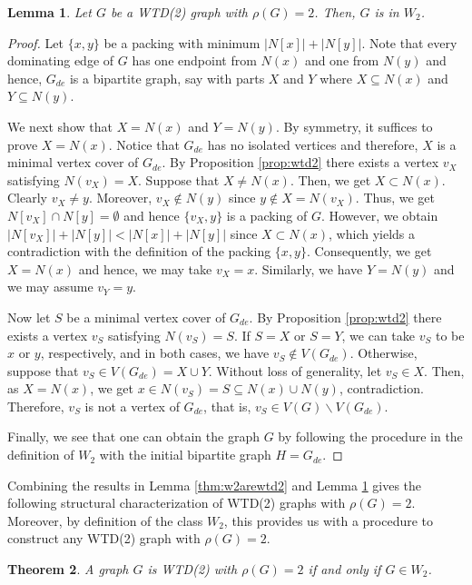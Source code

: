 \documentclass[11pt]{article}
\newtheorem{theorem}{Theorem}[section]
\newtheorem{lemma}[theorem]{Lemma}
\theoremstyle{definition}
\begin{document}
\begin{lemma}\label{lem:wtdimpw2}
Let $G$ be a WTD(2) graph with $\rho (G)=2$. Then, $G$ is in $W_2$.
\end{lemma}
\begin{proof}
Let $\{x,y\}$ be a packing with minimum $|N[x]|+ |N[y]|$.
Note that every dominating edge of $G$ has one endpoint from $N(x)$ and one from $N(y)$ and hence,
$G_{de}$ is a bipartite graph, say with parts $X$ and $Y$ where $X\subseteq N(x)$ and $Y\subseteq N(y)$.
	
We next show that $X=N(x)$ and $Y=N(y)$.
By symmetry, it suffices to prove $X=N(x)$.
Notice that $G_{de}$ has no isolated vertices and therefore,
$X$ is a minimal vertex cover of $G_{de}$.
By Proposition \ref{prop:wtd2} there exists a vertex $v_X$ satisfying $N(v_X)=X$.
Suppose that $X\neq N(x)$.
Then, we get $X \subset N(x)$.
Clearly $v_X \neq y$.
Moreover, $v_X \notin N(y)$ since $y\notin X=N(v_X)$.
Thus, we get $N[v_X] \cap N[y] = \emptyset$ and hence $\{v_X,y\}$ is a packing of $G$.
However, we obtain $|N[v_X]|+| N[y]|< |N[x]|+ |N[y]|$ since $X \subset N(x)$, which yields a contradiction with the definition of the packing $\{x,y\}$.
Consequently, we get $X=N(x)$ and hence, we may take $v_X=x$.
Similarly, we have $Y=N(y)$ and we may assume $v_Y=y$.
	
Now let $S$ be a minimal vertex cover of $G_{de}$.
By Proposition \ref{prop:wtd2} there exists a vertex $v_S$ satisfying $N(v_S)=S$.	If $S=X$ or $S=Y$, we can take $v_S$ to be $x$ or $y$, respectively, and in both cases, we have $v_S\notin V(G_{de})$.
Otherwise, suppose that $v_S \in V(G_{de})=X\cup Y$.
Without loss of generality, let $v_S \in X$.
Then, as $X=N(x)$, we get $x\in N(v_S)=S \subseteq N(x) \cup N(y)$, contradiction.
Therefore, $v_S$ is not a vertex of $G_{de}$, that is, $v_S \in V(G)\backslash V(G_{de})$.

Finally, we see that one can obtain the graph $G$ by following the procedure in the definition of $W_2$ with the initial bipartite graph $H=G_{de}$.
\end{proof}


Combining the results in Lemma \ref{thm:w2arewtd2} and Lemma \ref{lem:wtdimpw2} gives the following structural characterization of WTD(2) graphs with $\rho(G)=2$. 
Moreover, by definition of the class $W_2$, this provides us with a procedure to construct any WTD(2) graph  with $\rho(G)=2$.
\begin{theorem}\label{cor:w2wtd2}
A graph $G$ is WTD(2) with $\rho(G)=2$ if and only if $G\in W_2$.
\end{theorem}
\end{document}
